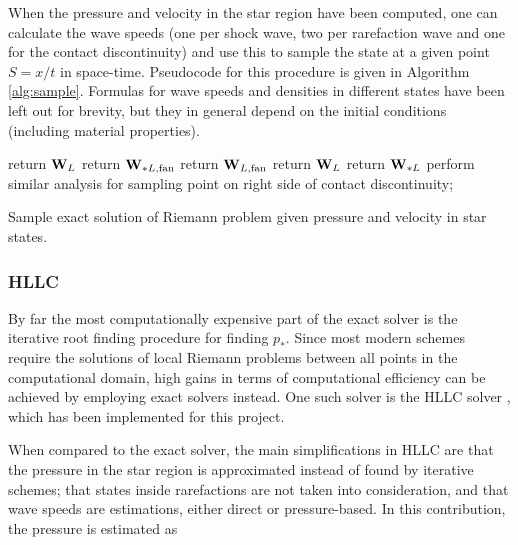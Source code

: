 \documentclass[final,3p,twocolumn]{elsarticle}
\begin{document}
When the pressure and velocity in the star region have been computed, one can
calculate the wave speeds (one per shock wave, two per rarefaction wave and one
for the contact discontinuity) and use this to sample the state at a given
point $S = x/t$ in space-time. Pseudocode for this procedure is given in
Algorithm \ref{alg:sample}. Formulas for wave speeds and densities in different
states have been left out for brevity, but they in general depend on the
initial conditions (including material properties).

\begin{algorithm}[htb]
    {
        {
            {
                return ${\bf W}_L$\;
            }
            {
                {
                    return ${\bf W}_{*L, {\rm fan}}$\;
                }
                {
                    return ${\bf W}_{L, {\rm fan}}$\;
                }
            }
        }
        {
            {
                return ${\bf W}_L$\;
            }
            {
                return ${\bf W}_{*L}$\;
            }
        }
    }
    {
        perform similar analysis for sampling point on right side of contact
        discontinuity; 
    }
    \caption{Sample exact solution of Riemann problem given pressure and
    velocity in star states.}
    \label{alg:sample}
\end{algorithm}

\subsubsection{HLLC}
\label{subsubsec:hllc}

By far the most computationally expensive part of the exact solver is the
iterative root finding procedure for finding $p_*$. Since most modern schemes
require the solutions of local Riemann problems between all points in the
computational domain, high gains in terms of computational efficiency can be
achieved by employing exact solvers instead. One such solver is the HLLC solver
\cite{toro1994restoration}, which has been implemented for this project. 

When compared to the exact solver, the main simplifications in HLLC are that
the pressure in the star region is approximated instead of found by iterative
schemes; that states inside rarefactions are not taken into consideration, and 
that wave speeds are estimations, either direct or pressure-based. In this
contribution, the pressure is estimated as 
\end{document}
